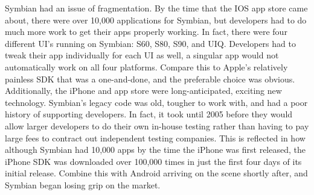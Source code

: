 \documentclass{article}
\begin{document}
Symbian had an issue of fragmentation. By the time that the IOS app store came about, there were over 10,000 applications for Symbian, but developers had to do much more work to get their apps properly working. In fact, there were four different UI's running on Symbian: S60, S80, S90, and UIQ.\cite{best_2013} Developers had to tweak their app individually for each UI as well, a singular app would not automatically work on all four platforms. Compare this to Apple's relatively painless SDK that was a one-and-done, and the preferable choice was obvious. Additionally, the iPhone and app store were long-anticipated, exciting new technology. Symbian's legacy code was old, tougher to work with, and had a poor history of supporting developers. In fact, it took until 2005 before they would allow larger developers to do their own in-house testing rather than having to pay large fees to contract out independent testing companies.\cite{kotadia_2004} This is reflected in how although Symbian had 10,000 apps by the time the iPhone was first released, the iPhone SDK was downloaded over 100,000 times in just the first four days of its initial release.\cite{apple_newsroom_2008} Combine this with Android arriving on the scene shortly after, and Symbian began losing grip on the market.
\end{document}
